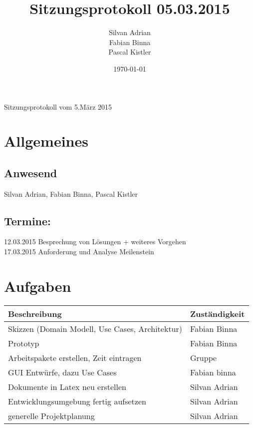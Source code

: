\documentclass[11pt]{scrartcl}
\title{Sitzungsprotokoll 05.03.2015}
\author{Silvan Adrian \\ Fabian Binna \\ Pascal Kistler}
\date{\today{}}
\begin{document}
{\huge Sitzungsprotokoll vom 5.März 2015}

\section{Allgemeines}
\label{sec:Allgemein}

\subsection{Anwesend}
\label{sec:Anwesend}
Silvan Adrian, Fabian Binna, Pascal Kistler

\subsection{Termine:}
\label{sec:Termine}
12.03.2015 Besprechung von Lösungen + weiteres Vorgehen \\
17.03.2015 Anforderung und Analyse Meilenstein
\section{Aufgaben}
\label{sec:Aufgaben}
\begin{table}[h]
\begin{tabularx}{\textwidth}{X l }
\textbf{Beschreibung}  & \textbf{Zuständigkeit} \\
\hline
Skizzen (Domain Modell, Use Cases, Architektur) & Fabian Binna\\
\hline
Prototyp & Fabian Binna \\
\hline
Arbeitspakete erstellen, Zeit eintragen & Gruppe \\
\hline
GUI Entwürfe, dazu Use Cases & Fabian binna \\
\hline
Dokumente in Latex neu erstellen & Silvan Adrian \\
\hline
Entwicklungsumgebung fertig aufsetzen & Silvan Adrian \\
\hline
generelle Projektplanung & Silvan Adrian \\
\end{tabularx}
\end{table}
\end{document}
